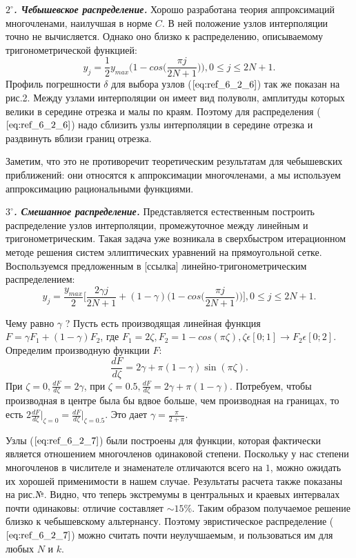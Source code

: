 \textbf{\textit{$2^{\circ}$. Чебышевское распределение.}} Хорошо разработана теория аппроксимаций многочленами, наилучшая в норме $C$. В ней положение узлов интерполяции точно не вычисляется. Однако оно близко к распределению, описываемому тригонометрической функцией:
\begin{equation}
y_j = \frac{1}{2} y_{max} \Bigg(1 - cos\Bigg( \frac{\pi j}{2N+1} \Bigg) \Bigg),0 \leqslant j \leqslant 2N + 1.
\label{eq:ref_6_2_6}
\end{equation}
Профиль погрешности $\delta$ для выбора узлов ($\ref{eq:ref_6_2_6}$) так же показан на рис.2. Между узлами интерполяции он имеет вид полуволн, амплитуды которых велики в середине отрезка и малы по краям. Поэтому для распределения ($\ref{eq:ref_6_2_6}$) надо сблизить узлы интерполяции в середине отрезка и раздвинуть вблизи границ отрезка.

Заметим, что это не противоречит теоретическим результатам для чебышевских приближений: они относятся к аппроксимации многочленами, а мы используем аппроксимацию рациональными функциями.

\textbf{\textit{$3^{\circ}$. Смешанное распределение.}} Представляется естественным построить распределение узлов интерполяции, промежуточное между линейным и тригонометрическим. Такая задача уже возникала в сверхбыстром итерационном методе решения систем эллиптических уравнений на прямоугольной сетке. Воспользуемся предложенным в [ссылка] линейно-тригонометрическим распределением:
\begin{equation}
y_j = \frac{y_{max}}{2} \Bigg[ \frac{2\gamma j}{2N+1} + (1-\gamma)\Bigg(1 - cos \Bigg(\frac{\pi j}{2N + 1}\Bigg) \Bigg)\Bigg], 0 \leqslant j \leqslant 2N+1.
\label{eq:ref_6_2_7}
\end{equation}

Чему равно $\gamma$ ? Пусть есть производящая линейная функция
$F = \gamma F_1 + (1-\gamma)F_2$, где $F_1 = 2\zeta, F_2 = 1 - cos(\pi \zeta), \zeta \epsilon [0;1] \to F_2 \epsilon [0;2]$. Определим производную функции $F$:
\begin{equation}
\frac{dF}{d\zeta} = 2\gamma + \pi (1-\gamma)\sin(\pi \zeta).
\end{equation}
При $\zeta = 0, \frac{dF}{d\zeta} = 2\gamma$, при $\zeta = 0.5, \frac{dF}{d\zeta} = 2\gamma + \pi (1-\gamma)$. Потребуем, чтобы производная в центре была бы вдвое больше, чем производная на границах, то есть $2\frac{dF}{d\zeta}\Bigg|_{\zeta=0} = \frac{dF}{d\zeta}\Bigg|_{\zeta=0.5}$. Это дает $\gamma = \frac{\pi}{2+\pi}$.

Узлы ($\ref{eq:ref_6_2_7}$) были построены для функции, которая фактически является
отношением многочленов одинаковой степени. Поскольку у нас степени
многочленов в числителе и знаменателе отличаются всего на $1$, можно ожидать их хорошей применимости в нашем случае. Результаты расчета также
показаны на рис.№. Видно, что теперь экстремумы в центральных и краевых
интервалах почти одинаковы: отличие составляет $\sim 15\%$. Таким образом получаемое решение близко к чебышевскому альтернансу. Поэтому эвристическое распределение ($\ref{eq:ref_6_2_7}$) можно считать почти неулучшаемым, и пользоваться им для любых $N$ и $k$.

